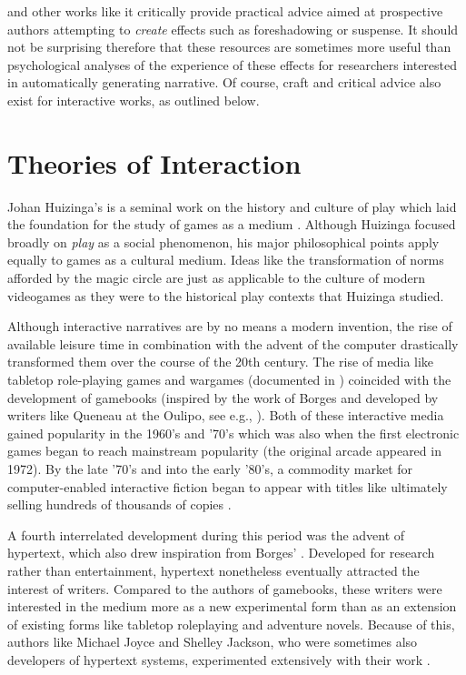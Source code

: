  and other works like it critically provide practical advice aimed at prospective authors attempting to \emph{create} effects such as foreshadowing or suspense.
%
It should not be surprising therefore that these resources are sometimes more useful than psychological analyses of the experience of these effects for researchers interested in automatically generating narrative.
%
Of course, craft and critical advice also exist for interactive works, as outlined below.


\section{Theories of Interaction}

Johan Huizinga's  is a seminal work on the history and culture of play which laid the foundation for the study of games as a medium \citep{Huizinga1949}.
%
Although Huizinga focused broadly on \emph{play} as a social phenomenon, his major philosophical points apply equally to games as a cultural medium.
%
Ideas like the transformation of norms afforded by the magic circle are just as applicable to the culture of modern videogames as they were to the historical play contexts that Huizinga studied.


Although interactive narratives are by no means a modern invention, the rise of available leisure time in combination with the advent of the computer drastically transformed them over the course of the 20th century.
%
The rise of media like tabletop role-playing games and wargames (documented in \citep{Peterson2012}) coincided with the development of gamebooks (inspired by the work of Borges \citep{Borges1956} and developed by writers like Queneau at the Oulipo, see e.g., \citep{Queneau1967}).
%
Both of these interactive media gained popularity in the 1960's and '70's which was also when the first electronic games began to reach mainstream popularity (the original arcade  appeared in 1972).
%
By the late '70's and into the early '80's, a commodity market for computer-enabled interactive fiction began to appear with titles like  ultimately selling hundreds of thousands of copies \citep{Zork}.


A fourth interrelated development during this period was the advent of hypertext, which also drew inspiration from Borges' .
%
Developed for research rather than entertainment, hypertext nonetheless eventually attracted the interest of writers.
%
Compared to the authors of gamebooks, these writers were interested in the medium more as a new experimental form than as an extension of existing forms like tabletop roleplaying and adventure novels.
%
Because of this, authors like Michael Joyce and Shelley Jackson, who were sometimes also developers of hypertext systems, experimented extensively with their work \citep{Joyce1990, Jackson1995}.


